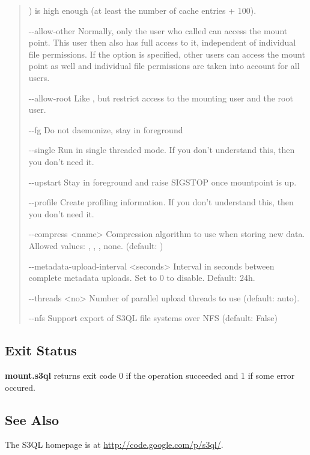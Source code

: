 \documentclass[letterpaper,10pt,english]{sphinxmanual}
\begin{document}
\begin{quote}
\begin{optionlist}{3cm}
) is high enough (at least the number of
cache entries + 100).
\item [-{-}allow-other]  
Normally, only the user who called  can
access the mount point. This user then also has full
access to it, independent of individual file
permissions. If the  option is
specified, other users can access the mount point as
well and individual file permissions are taken into
account for all users.
\item [-{-}allow-root]  
Like , but restrict access to the
mounting user and the root user.
\item [-{-}fg]  
Do not daemonize, stay in foreground
\item [-{-}single]  
Run in single threaded mode. If you don't understand
this, then you don't need it.
\item [-{-}upstart]  
Stay in foreground and raise SIGSTOP once mountpoint
is up.
\item [-{-}profile]  
Create profiling information. If you don't understand
this, then you don't need it.
\item [-{-}compress \textless{}name\textgreater{}]  
Compression algorithm to use when storing new data.
Allowed values: , , , none.
(default: )
\item [-{-}metadata-upload-interval \textless{}seconds\textgreater{}]  
Interval in seconds between complete metadata uploads.
Set to 0 to disable. Default: 24h.
\item [-{-}threads \textless{}no\textgreater{}]  
Number of parallel upload threads to use (default:
auto).
\item [-{-}nfs]  
Support export of S3QL file systems over NFS (default:
False)
\end{optionlist}
\end{quote}


\subsection{Exit Status}
\label{man/mount:exit-status}
\textbf{mount.s3ql} returns exit code 0 if the operation succeeded and 1 if some
error occured.


\subsection{See Also}
\label{man/mount:see-also}
The S3QL homepage is at \href{http://code.google.com/p/s3ql/}{http://code.google.com/p/s3ql/}.
\end{document}

